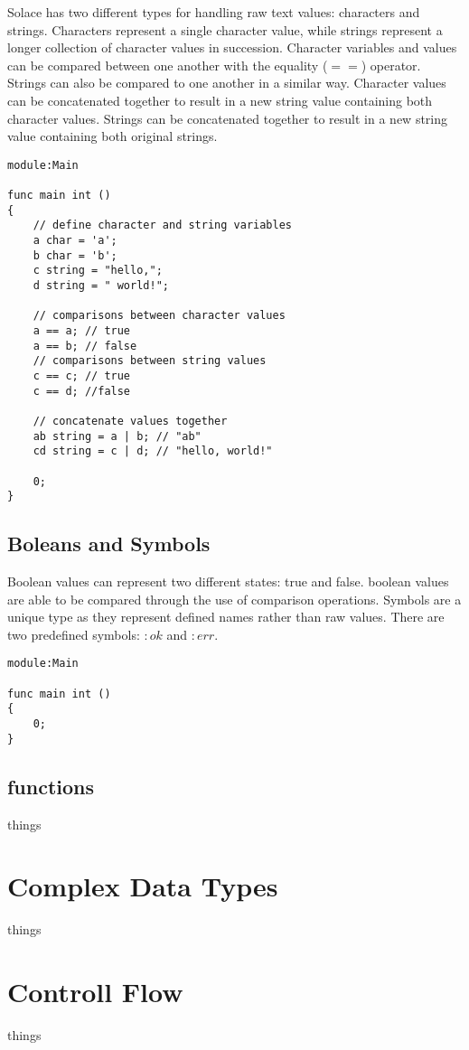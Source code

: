 \documentclass{article}
\begin{document}
Solace has two different types for handling raw text values: characters and strings. Characters
represent a single character value, while strings represent a longer collection of character
values in succession. Character variables and values can be compared between one another
with the equality ($==$) operator. Strings can also be compared to one another in a
similar way. Character values can be concatenated together to result in a new string value
containing both character values. Strings can be concatenated together to result in a new
string value containing both original strings.

\begin{lstlisting}
module:Main

func main int ()
{
	// define character and string variables
	a char = 'a';
	b char = 'b';
	c string = "hello,";
	d string = " world!";
	
	// comparisons between character values
	a == a; // true
	a == b; // false
	// comparisons between string values
	c == c; // true
	c == d; //false
	
	// concatenate values together
	ab string = a | b; // "ab"
	cd string = c | d; // "hello, world!"
	
	0;
}
\end{lstlisting}

\subsection{Boleans and Symbols}

Boolean values can represent two different states: true and false. boolean values are
able to be compared through the use of comparison operations. Symbols are a unique type
as they represent defined names rather than raw values. There are two predefined symbols:
$:ok$ and $:err$.

\begin{lstlisting}
module:Main

func main int ()
{
	0;
}
\end{lstlisting}

\subsection{functions}

things

\section{Complex Data Types}

things

\section{Controll Flow}

things
\end{document}
